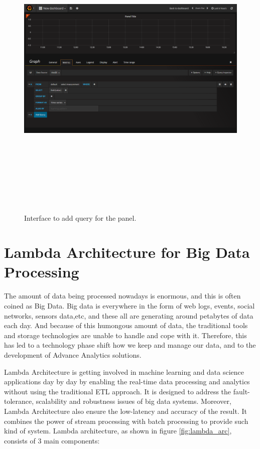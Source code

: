  \begin{figure}[htpb]
	\centering
	\includegraphics[width=16cm,height=15cm,keepaspectratio=true]{images/gr_query}
	\caption{
		Interface to add query for the panel.
	}
	\label{fig:gr_query}
\end{figure}


\section{Lambda Architecture for Big Data Processing}
The amount of data being processed nowadays is enormous, and this is often coined as Big Data. Big data is everywhere in the form of web logs, events, social networks, sensors data,etc, and these all are generating around petabytes of data each day. And because of this humongous amount of data, the traditional tools and storage technologies are unable to handle and cope with it. Therefore, this has led to a technology phase shift how we keep and manage our data, and to the development of Advance Analytics solutions.

Lambda Architecture \cite{UBDLAH} \cite{oreillyla} \cite{7364082} \cite{maprla} is getting involved in machine learning and data science applications day by day by enabling the real-time data processing and analytics without using the traditional ETL approach. It is designed to address the fault-tolerance, scalability and robustness issues of big data systems. Moreover, Lambda Architecture also ensure the low-latency and accuracy of the result. It combines the power of stream processing with batch processing to provide such kind of system.
Lambda architecture, as shown in figure \ref{fig:lambda_arc}, consists of 3 main components:


